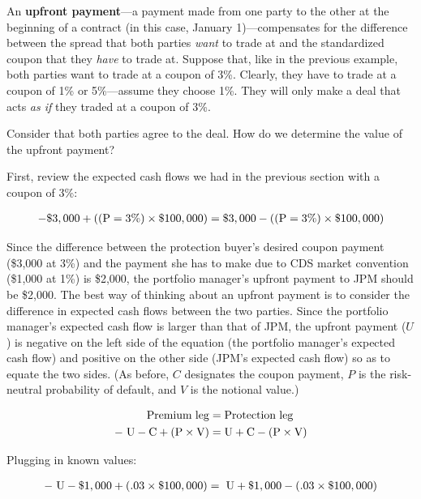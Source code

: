 \documentclass{jss}
\begin{document}
An \textbf{upfront payment}---a payment made from one party to the other at the beginning of a contract (in this case, January 1)---compensates for the difference between the spread that both parties \emph{want} to trade at and the standardized coupon that they \emph{have} to trade at. Suppose that, like in the previous example, both parties want to trade at a coupon of 3\%. Clearly, they have to trade at a coupon of 1\% or 5\%---assume they choose 1\%. They will only make a deal that acts \emph{as if} they traded at a coupon of 3\%. 

Consider that both parties agree to the deal. How do we determine the value of the upfront payment?

First, review the expected cash flows we had in the previous section with a coupon of 3\%:

\begin{equation}
 \begin{aligned}
   {\rm - \$3,000 + ((P = 3\%) \times \$100,000) = \$3,000 - ((P = 3\%) \times \$100,000)}
    \end{aligned}
\end{equation}

Since the difference between the protection buyer's desired coupon payment (\$3,000 at 3\%) and the payment she has to make due to CDS market convention (\$1,000 at 1\%) is \$2,000, the portfolio manager's upfront payment to JPM should be \$2,000. The best way of thinking about an upfront payment is to consider the difference in expected cash flows between the two parties. Since the portfolio manager's expected cash flow is larger than that of JPM, the upfront payment ($U$) is negative on the left side of the equation (the portfolio manager's expected cash flow) and positive on the other side (JPM's expected cash flow) so as to equate the two sides. (As before, $C$ designates the coupon payment, $P$ is the risk-neutral probability of default, and $V$ is the notional value.)

\label{eqn:Upfront}
\begin{align}
   \rm Premium\hspace{3pt}leg &= \rm Protection\hspace{3pt}leg \\
   \rm -\hspace{3pt}U - C + (P \times V) &= \rm U + C - (P \times V)
\end{align}

Plugging in known values:

\begin{equation}
 \begin{aligned}
   {\rm -\hspace{3pt}U - \$1,000 + (.03 \times \$100,000) = \hspace{3pt}U + \$1,000 - (.03 \times \$100,000)}
    \end{aligned}
\end{equation}
\end{document}
